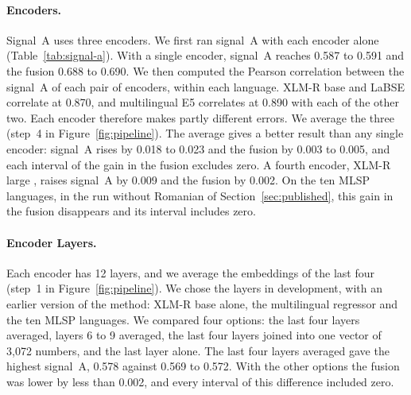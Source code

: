 \paragraph{Encoders.} Signal~A uses three encoders. We first ran signal~A with each encoder alone %
(Table~\ref{tab:signal-a}). With a single encoder, signal~A reaches 0.587 to 0.591 and the fusion %
0.688 to 0.690. We then computed the Pearson correlation between the signal~A of each pair of
encoders, within each language. XLM-R base and LaBSE correlate at 0.870, and multilingual E5 correlates %
at 0.890 with each of the other two. Each encoder therefore makes partly different errors. We
average the three (step~4 in Figure~\ref{fig:pipeline}). The average gives a better result than any %
single encoder: signal~A rises by 0.018 to 0.023 and the fusion by 0.003 to 0.005, and each %
interval of the gain in the fusion excludes zero. A fourth encoder, XLM-R large %
\citep{conneau2020xlmr}, raises signal~A by 0.009 and the fusion by 0.002. On the ten MLSP %
languages, in the run without Romanian of Section~\ref{sec:published}, this gain in the fusion %
disappears and its interval includes zero.

\paragraph{Encoder Layers.} Each encoder has 12 layers, and we average the embeddings of the last %
four (step~1 in Figure~\ref{fig:pipeline}). We chose the layers in development, with an earlier version of the method: XLM-R base %
alone, the multilingual regressor and the ten MLSP languages. We compared four options: the last %
four layers averaged, layers 6 to 9 averaged, the last four layers joined into one vector of
3{,}072 numbers, and the last layer alone. The last four layers averaged gave the highest %
signal~A, 0.578 against 0.569 to 0.572. With the other options the fusion was lower by less than %
0.002, and every interval of this difference included zero.

